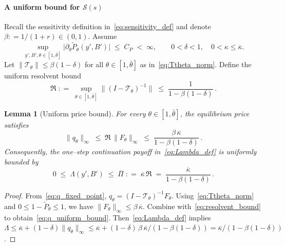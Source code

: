 \documentclass[12pt]{article}
\providecommand{\coloneqq}{\mathrel{\mathop:}=}
\theoremstyle{plain}
\newtheorem{lemma}{Lemma}
\begin{document}
\paragraph{A uniform bound for $\mathcal S(s)$}
Recall the sensitivity definition in~\eqref{eq:sensitivity_def} and denote
$\beta\coloneqq 1/(1+r)\in(0,1)$. Assume
\begin{equation}\label{eq:Ptheta_bound}
	\sup_{y',B',\theta\in[1,\bar\theta]}\big|\partial_\theta\tilde P_\theta(y',B')\big|\;\le\;C_P\;<\;\infty,\qquad 0<\delta<1,\quad 0<\kappa\le \overline\kappa.
\end{equation}
Let $\|\mathcal T_\theta\|\le \beta(1-\delta)$ for all $\theta\in[1,\bar\theta]$ as in~\eqref{eq:Ttheta_norm}. Define the uniform resolvent bound
\begin{equation}\label{eq:resolvent_bound}
	\mathfrak R\;\coloneqq\;\sup_{\theta\in[1,\bar\theta]}\big\|(I-\mathcal T_\theta)^{-1}\big\|\;\le\;\frac{1}{1-\beta(1-\delta)}\,.
\end{equation}

\begin{lemma}[Uniform price bound]\label{lem:q_uniform_bound}
	For every $\theta\in[1,\bar\theta]$, the equilibrium price satisfies
	\begin{equation}\label{eq:q_uniform_bound}
		\|q_\theta\|_\infty\;\le\;\mathfrak R\,\|F_\theta\|_\infty\;\le\;\frac{\beta\,\overline\kappa}{1-\beta(1-\delta)}\,.
	\end{equation}
	Consequently, the one–step continuation payoff in~\eqref{eq:Lambda_def} is uniformly bounded by
	\begin{equation}\label{eq:Lambda_uniform_bound}
		0\;\le\;\Lambda(y',B')\;\le\;\overline\Pi\;\coloneqq\;\overline\kappa\,\mathfrak R\;=\;\frac{\overline\kappa}{1-\beta(1-\delta)}\,.
	\end{equation}
\end{lemma}

\begin{proof}
	From~\eqref{eq:q_fixed_point}, $q_\theta=(I-\mathcal T_\theta)^{-1}F_\theta$. Using~\eqref{eq:Ttheta_norm} and $0\le 1-\tilde P_\theta\le 1$, we have $\|F_\theta\|_\infty\le \beta\,\overline\kappa$. Combine with~\eqref{eq:resolvent_bound} to obtain~\eqref{eq:q_uniform_bound}. Then~\eqref{eq:Lambda_def} implies $\Lambda\le \overline\kappa+(1-\delta)\|q_\theta\|_\infty\le \overline\kappa+(1-\delta)\,\beta\,\overline\kappa/(1-\beta(1-\delta))=\overline\kappa/(1-\beta(1-\delta))$.
\end{proof}
\end{document}
